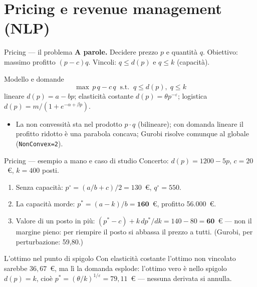 \documentclass[11pt,aspectratio=169]{beamer}
\begin{document}
\section{Pricing e revenue management (NLP)}

\begin{frame}{Pricing --- il problema}
\textbf{A parole.} Decidere prezzo $p$ e quantità $q$. Obiettivo: massimo profitto
$(p - c)q$. Vincoli: $q \le d(p)$ e $q \le k$ (capacità).
\begin{block}{Modello e domande}
\vspace{-1ex}
\[
\max\, p\,q - c\,q \;\;\text{s.t.}\;\; q \le d(p),\; q \le k
\]
lineare $d(p) = a - bp$; elasticità costante $d(p) = \theta p^{-\varepsilon}$;
logistica $d(p) = m/(1 + e^{-\alpha + \beta p})$.
\end{block}
\begin{itemize}
  \item La non convessità sta nel prodotto $p \cdot q$ (bilineare); con domanda
        lineare il profitto ridotto è una parabola concava; Gurobi risolve comunque
        al globale (\texttt{NonConvex=2}).
\end{itemize}
\end{frame}

\begin{frame}{Pricing --- esempio a mano e caso di studio}
Concerto: $d(p) = 1200 - 5p$, $c = 20$~\euro, $k = 400$ posti.
\begin{enumerate}
  \item Senza capacità: $p^\circ = (a/b + c)/2 = 130$~\euro, $q^\circ = 550$.
  \item La capacità morde: $p^* = (a - k)/b = \textbf{160}$~\euro,
        profitto 56.000~\euro.
  \item Valore di un posto in più: $(p^* - c) + k\,dp^*/dk = 140 - 80 =
        \textbf{60}$~\euro{} --- \alert{non} il margine pieno: per riempire il posto
        si abbassa il prezzo a tutti. (Gurobi, per perturbazione: 59,80.)
\end{enumerate}
\begin{block}{L'ottimo nel punto di spigolo}
Con elasticità costante l'ottimo non vincolato sarebbe $36{,}67$~\euro, ma lì la
domanda esplode: l'ottimo vero è nello spigolo $d(p) = k$, cioè
$p^* = (\theta/k)^{1/\varepsilon} = 79{,}11$~\euro{} --- nessuna derivata si annulla.
\end{block}
\end{frame}
\end{document}
